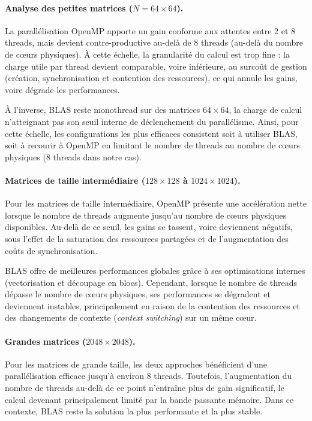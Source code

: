 \documentclass[a4paper,11pt]{article}
\begin{document}
\paragraph{Analyse des petites matrices ($N = 64 \times 64$).}
La parallélisation OpenMP apporte un gain conforme aux attentes entre 2 et 8 threads, mais devient contre-productive au-delà de 8 threads (au-delà du nombre de cœurs physiques). À cette échelle, la granularité du calcul est trop fine : la charge utile par thread devient comparable, voire inférieure, au surcoût de gestion (création, synchronisation et contention des ressources), ce qui annule les gains, voire dégrade les performances.

À l'inverse, BLAS reste monothread sur des matrices $64 \times 64$, la charge de calcul n'atteignant pas son seuil interne de déclenchement du parallélisme. Ainsi, pour cette échelle, les configurations les plus efficaces consistent soit à utiliser BLAS, soit à recourir à OpenMP en limitant le nombre de threads au nombre de cœurs physiques (8 threads dans notre cas).

\paragraph{Matrices de taille intermédiaire ($128 \times 128$ à $1024 \times 1024$).}
Pour les matrices de taille intermédiaire, OpenMP présente une accélération nette lorsque le nombre de threads augmente jusqu'au nombre de cœurs physiques disponibles. Au-delà de ce seuil, les gains se tassent, voire deviennent négatifs, sous l'effet de la saturation des ressources partagées et de l'augmentation des coûts de synchronisation.

BLAS offre de meilleures performances globales grâce à ses optimisations internes (vectorisation et découpage en blocs). Cependant, lorsque le nombre de threads dépasse le nombre de cœurs physiques, ses performances se dégradent et deviennent instables, principalement en raison de la contention des ressources et des changements de contexte (\emph{context switching}) sur un même cœur.

\paragraph{Grandes matrices ($2048 \times 2048$).}
Pour les matrices de grande taille, les deux approches bénéficient d'une parallélisation efficace jusqu'à environ 8 threads. Toutefois, l'augmentation du nombre de threads au-delà de ce point n'entraîne plus de gain significatif, le calcul devenant principalement limité par la bande passante mémoire. Dans ce contexte, BLAS reste la solution la plus performante et la plus stable.
\end{document}
